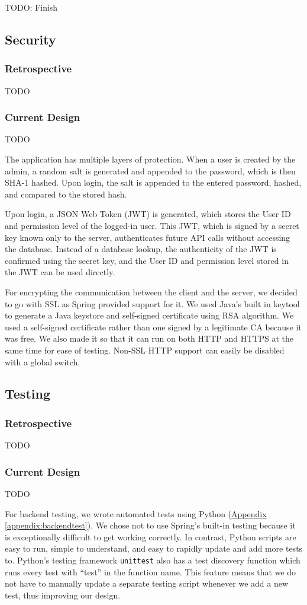 \documentclass[12pt]{article}
\begin{document}
TODO: Finish

\subsection{Security}
\subsubsection{Retrospective}
TODO
\subsubsection{Current Design}
TODO

The application has multiple layers of protection. When a user is created by the admin, a random salt is generated and appended to the password, which is then SHA-1 hashed. Upon login, the salt is appended to the entered password, hashed, and compared to the stored hash. 

Upon login, a JSON Web Token (JWT) is generated, which stores the User ID and permission level of the logged-in user. This JWT, which is signed by a secret key known only to the server, authenticates future API calls without accessing the database. Instead of a database lookup, the authenticity of the JWT is confirmed using the secret key, and the User ID and permission level stored in the JWT can be used directly. 

For encrypting the communication between the client and the server, we decided to go with SSL as Spring provided support for it. We used Java's built in keytool to generate a Java keystore and self-signed certificate using RSA algorithm. We used a self-signed certificate rather than one signed by a legitimate CA because it was free. We also made it so that it can run on both HTTP and HTTPS at the same time for ease of testing. Non-SSL HTTP support can easily be disabled with a global switch.

\subsection{Testing}
\subsubsection{Retrospective}
TODO
\subsubsection{Current Design}
TODO

For backend testing, we wrote automated tests using Python (\hyperref[appendix:backendtest]{Appendix \ref{appendix:backendtest}}). We chose not to use Spring's built-in testing because it is exceptionally difficult to get working correctly. In contrast, Python scripts are easy to run, simple to understand, and easy to rapidly update and add more tests to. Python's testing framework \texttt{unittest} also has a test discovery function which runs every test with ``test'' in the function name. This feature means that we do not have to manually update a separate testing script whenever we add a new test, thus improving our design.
\end{document}
